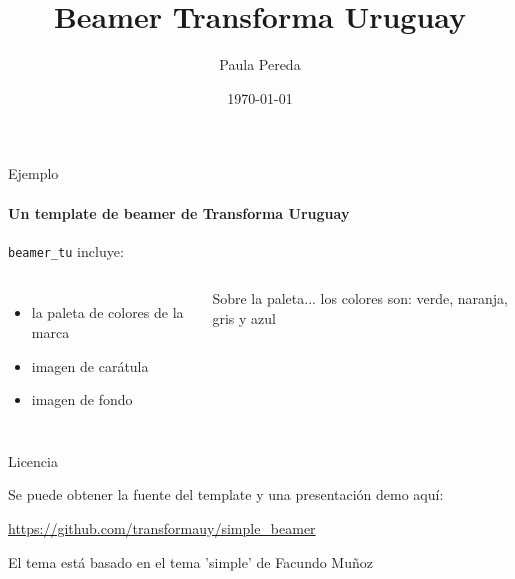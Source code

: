 \documentclass{beamer}
\title{\textcolor{normal}{Beamer Transforma Uruguay}}
\subtitle{}
\date{\today}
\author{Paula Pereda}
\institute{\url{http://github.com/transformauy}}
\begin{document}
{
  \begin{frame}
   \vspace*{80pt}
   \hspace*{1em}
\titlepage
  \end{frame}
}


\begin{frame}{Ejemplo}
  \framesubtitle{Un template de beamer de Transforma Uruguay}

  \texttt{beamer\_tu} incluye: 

  \begin{columns}
      \begin{itemize}
        \item la \alert{paleta de colores} de la marca
        \item imagen de carátula
        \item imagen de fondo
      \end{itemize}

      \begin{block}{Sobre la paleta...}
         los colores son: verde, naranja, gris y azul
      \end{block}
  \end{columns}
  
\end{frame}

\begin{frame}{Licencia}

  \begin{block}{Se puede obtener la fuente del template y una presentación demo aquí:}

  \begin{center}\url{https://github.com/transformauy/simple_beamer}\end{center}

  \end{block}
  
  \begin{block}{El tema está basado en el tema 'simple' de Facundo Muñoz}
  \end{block}
\end{frame}
\end{document}

